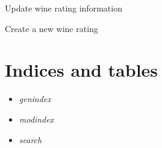 \documentclass[letterpaper,10pt,english]{sphinxmanual}
\begin{document}
\begin{fulllineitems}
\label{personality:get--api-v1-rating-_id_-}
\end{fulllineitems}


Update wine rating information


\begin{fulllineitems}
\label{personality:put--api-v1-rating-_id_-}
\end{fulllineitems}


Create a new wine rating


\begin{fulllineitems}
\label{personality:post--api-v1-rating-}
\end{fulllineitems}



\chapter{Indices and tables}
\label{index:indices-and-tables}\begin{itemize}
\item {} 
\emph{genindex}

\item {} 
\emph{modindex}

\item {} 
\emph{search}

\end{itemize}
\end{document}
